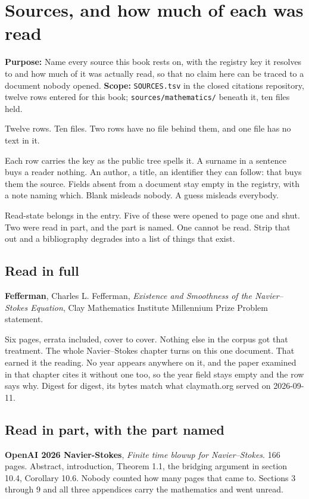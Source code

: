 \chapter{Sources, and how much of each was read}

\textbf{Purpose:} Name every source this book rests on, with the registry key it resolves to and
how much of it was actually read, so that no claim here can be traced to a document nobody opened.
\textbf{Scope:} \texttt{SOURCES.\allowbreak{}tsv} in the closed citations repository, twelve rows
entered for this book; \texttt{sources/\allowbreak{}mathematics/\allowbreak{}} beneath it, ten
files held.

Twelve rows. Ten files. Two rows have no file behind them, and one file has no text in it.

Each row carries the key as the public tree spells it. A surname in a sentence buys a reader
nothing. An author, a title, an identifier they can follow: that buys them the source. Fields absent
from a document stay empty in the registry, with a note naming which. Blank misleads nobody. A
guess misleads everybody.

Read-state belongs in the entry. Five of these were opened to page one and shut. Two were read in
part, and the part is named. One cannot be read. Strip that out and a bibliography degrades into a
list of things that exist.

\section{Read in full}

\textbf{Fefferman}, Charles L. Fefferman, \emph{Existence and Smoothness of the Navier--Stokes
Equation}, Clay Mathematics Institute Millennium Prize Problem statement.

Six pages, errata included, cover to cover. Nothing else in the corpus got that treatment. The
whole Navier--Stokes chapter turns on this one document. That earned it the reading. No year appears
anywhere on it, and the paper examined in that chapter cites it without one too, so the year field
stays empty and the row says why. Digest for digest, its bytes match what claymath.org served on
2026-09-11.

\section{Read in part, with the part named}

\textbf{OpenAI 2026 Navier-Stokes}, \emph{Finite time blowup for Navier--Stokes}. 166 pages.
Abstract, introduction, Theorem 1.1, the bridging argument in section 10.4, Corollary 10.6. Nobody
counted how many pages that came to. Sections 3 through 9 and all three appendices carry the
mathematics and went unread.


